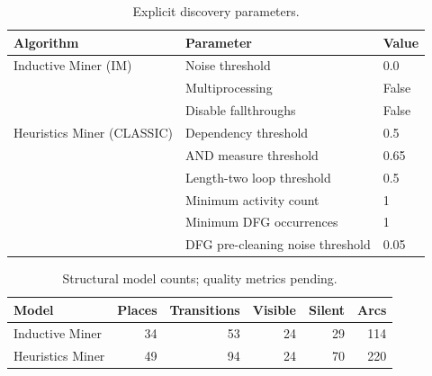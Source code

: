 \begin{table}[h!]
\centering
\caption{Explicit discovery parameters.}
\label{tab:discovery-parameters}
\begin{tabular}{@{}lll@{}}
\toprule
Algorithm & Parameter & Value \\
\midrule
Inductive Miner (IM) & Noise threshold & 0.0 \\
 & Multiprocessing & False \\
 & Disable fallthroughs & False \\
Heuristics Miner (CLASSIC) & Dependency threshold & 0.5 \\
 & AND measure threshold & 0.65 \\
 & Length-two loop threshold & 0.5 \\
 & Minimum activity count & 1 \\
 & Minimum DFG occurrences & 1 \\
 & DFG pre-cleaning noise threshold & 0.05 \\
\bottomrule
\end{tabular}
\end{table}

\begin{table}[h!]
\centering
\caption{Structural model counts; quality metrics pending.}
\label{tab:discovery-structure}
\begin{tabular}{@{}lrrrrr@{}}
\toprule
Model & Places & Transitions & Visible & Silent & Arcs \\
\midrule
Inductive Miner & 34 & 53 & 24 & 29 & 114 \\
Heuristics Miner & 49 & 94 & 24 & 70 & 220 \\
\bottomrule
\end{tabular}
\end{table}

